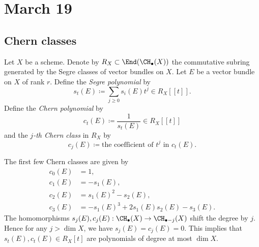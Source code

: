 \section{March 19}

\subsection{Chern classes}

  \begin{definition}
    Let $X$ be a scheme.
    Denote by $R_X \subset \End(\CH_\bullet (X))$ the commutative subring generated  by the Segre classes of vector bundles on $X$.
    Let $E$ be a vector bundle on $X$ of rank $r$.
    Define the \emph{Segre polynomial} by 
    \[ s_t(E) \coloneqq \sum_{j \geq 0} s_i(E) t^j \in R_X [[t]]. \]
    Define the \emph{Chern polynomial} by
    \[ c_t(E) \coloneqq \frac{1}{s_t(E)} \in R_X [[t]] \]
    and the \emph{$j$-th Chern class} in $R_X$ by
    \[ c_j(E) \coloneqq \text{the coefficient of } t^j \text{ in } c_t(E). \]
  \end{definition}

  The first few Chern classes are given by
  \begin{align*}
    c_0(E) & = 1, \\
    c_1(E) & = -s_1(E), \\
    c_2(E) & = s_1(E)^2 - s_2(E), \\
    c_3(E) & = -s_1(E)^3 + 2 s_1(E) s_2(E) - s_3(E).
  \end{align*}
  The homomorphisms $s_j(E), c_j(E): \CH_\bullet(X) \to \CH_{\bullet - j}(X)$ shift the degree by $j$.
  Hence for any $j > \dim X$, we have $s_j(E) = c_j(E) = 0$.
  This implies that $s_t(E), c_t(E) \in R_X [t]$ are polynomials of degree at most $\dim X$.

